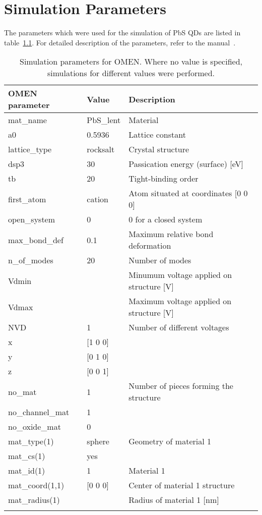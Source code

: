\chapter{Simulation Parameters}
\label{A}

The parameters which were used for the simulation of PbS QDs are listed in table~\ref{table:SimParams}. For detailed description of the \omen parameters, refer to the \omen manual~\cite{OMENmanual}.
\begin{table}
\centering
\begin{tabular}{l l l}
	OMEN parameter & Value & Description\\
	\hline
	mat\_name		& PbS\_lent	& Material \\
	a0				& 0.5936	& Lattice constant \\
	lattice\_type	& rocksalt	& Crystal structure \\
	dsp3 			& 30		& Passication energy (surface) [eV] \\
	tb				& 20		& Tight-binding order \\
	first\_atom 	& cation 	& Atom situated at  coordinates [0 0 0] \\
	open\_system 	& 0 		& 0 for a closed system\\
	max\_bond\_def 	& 0.1 		& Maximum relative bond deformation \\
	n\_of\_modes	& 20		& Number of modes \\
	Vdmin			& 			& Minumum voltage applied on structure [V] \\
	Vdmax			& 			& Maximum voltage applied on structure [V] \\
	NVD				& 1			& Number of different voltages \\
	x				& [1 0 0]	& \\
	y				& [0 1 0] 	& \\
	z				& [0 0 1]	& \\
	no\_mat 		& 1			& Number of pieces forming the structure\\
	no\_channel\_mat& 1			&  \\
	no\_oxide\_mat 	& 0			&  \\
	mat\_type(1)	& sphere	& Geometry of material 1 \\
	mat\_cs(1)		& yes		& \\
	mat\_id(1)		& 1			& Material 1 \\
	mat\_coord(1,1)	& [0 0 0]	& Center of material 1 structure \\
	mat\_radius(1)	& 			& Radius of material 1 [nm] \\\\
\end{tabular}
\caption{Simulation parameters for OMEN. Where no value is specified, simulations for different values were performed.}
\label{table:SimParams}
\end{table}